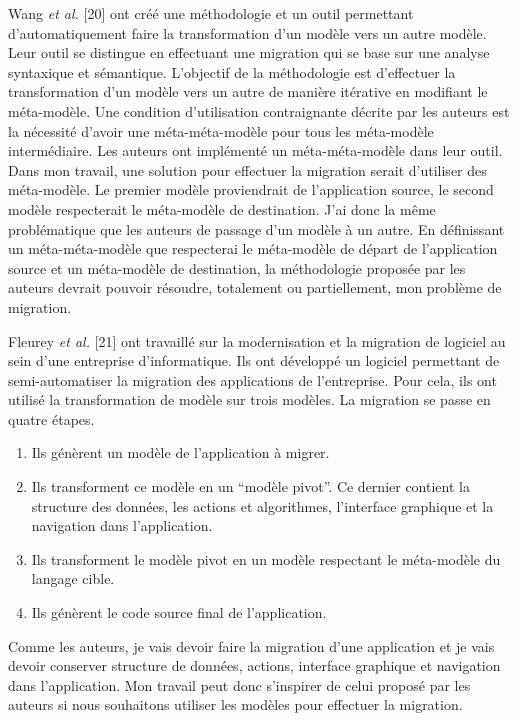 \documentclass[11pt,]{article}
\providecommand{\tightlist}{%
  \setlength{\itemsep}{0pt}\setlength{\parskip}{0pt}}
\begin{document}
Wang \emph{et al.} {[}20{]} ont créé une méthodologie et un outil
permettant d'automatiquement faire la transformation d'un modèle vers un
autre modèle. Leur outil se distingue en effectuant une migration qui se
base sur une analyse syntaxique et sémantique. L'objectif de la
méthodologie est d'effectuer la transformation d'un modèle vers un autre
de manière itérative en modifiant le méta-modèle. Une condition
d'utilisation contraignante décrite par les auteurs est la nécessité
d'avoir une méta-méta-modèle pour tous les méta-modèle intermédiaire.
Les auteurs ont implémenté un méta-méta-modèle dans leur outil. Dans mon
travail, une solution pour effectuer la migration serait d'utiliser des
méta-modèle. Le premier modèle proviendrait de l'application source, le
second modèle respecterait le méta-modèle de destination. J'ai donc la
même problématique que les auteurs de passage d'un modèle à un autre. En
définissant un méta-méta-modèle que respecterai le méta-modèle de départ
de l'application source et un méta-modèle de destination, la
méthodologie proposée par les auteurs devrait pouvoir résoudre,
totalement ou partiellement, mon problème de migration.

Fleurey \emph{et al.} {[}21{]} ont travaillé sur la modernisation et la
migration de logiciel au sein d'une entreprise d'informatique. Ils ont
développé un logiciel permettant de semi-automatiser la migration des
applications de l'entreprise. Pour cela, ils ont utilisé la
transformation de modèle sur trois modèles. La migration se passe en
quatre étapes.

\begin{enumerate}
\def\labelenumi{\arabic{enumi}.}
\tightlist
\item
  Ils génèrent un modèle de l'application à migrer.
\item
  Ils transforment ce modèle en un ``modèle pivot''. Ce dernier contient
  la structure des données, les actions et algorithmes, l'interface
  graphique et la navigation dans l'application.
\item
  Ils transforment le modèle pivot en un modèle respectant le
  méta-modèle du langage cible.
\item
  Ils génèrent le code source final de l'application.
\end{enumerate}

Comme les auteurs, je vais devoir faire la migration d'une application
et je vais devoir conserver structure de données, actions, interface
graphique et navigation dans l'application. Mon travail peut donc
s'inspirer de celui proposé par les auteurs si nous souhaitons utiliser
les modèles pour effectuer la migration.
\end{document}
